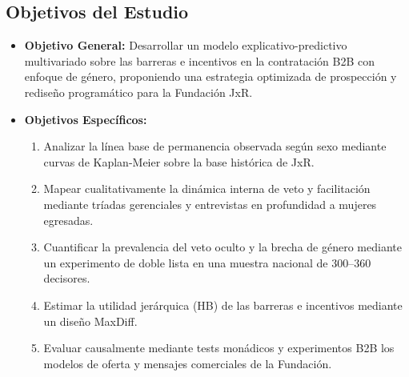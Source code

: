 \subsection{Objetivos del Estudio}
\begin{itemize}
    \item \textbf{Objetivo General:} Desarrollar un modelo explicativo-predictivo multivariado sobre las barreras e incentivos en la contratación B2B con enfoque de género, proponiendo una estrategia optimizada de prospección y rediseño programático para la Fundación JxR.
    \item \textbf{Objetivos Específicos:}
    \begin{enumerate}
        \item Analizar la línea base de permanencia observada según sexo mediante curvas de Kaplan-Meier sobre la base histórica de JxR.
        \item Mapear cualitativamente la dinámica interna de veto y facilitación mediante tríadas gerenciales y entrevistas en profundidad a mujeres egresadas.
        \item Cuantificar la prevalencia del veto oculto y la brecha de género mediante un experimento de doble lista en una muestra nacional de 300--360 decisores.
        \item Estimar la utilidad jerárquica (HB) de las barreras e incentivos mediante un diseño MaxDiff.
        \item Evaluar causalmente mediante tests monádicos y experimentos B2B los modelos de oferta y mensajes comerciales de la Fundación.
    \end{enumerate}
\end{itemize}